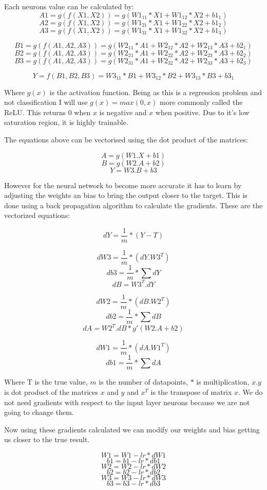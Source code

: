 \documentclass[11pt]{article}
\begin{document}
	Each neurons value can be calculated by:
	\[A1 = g(f(X1,X2)) = g(W1_{11}*X1 + W1_{12}*X2 + b1_{1})\]
	\[A2 = g(f(X1,X2)) = g(W1_{21}*X1 + W1_{22}*X2 + b1_{2})\]
	\[A3 = g(f(X1,X2)) = g(W1_{31}*X1 + W1_{32}*X2 + b1_{3})\]
	
	\[B1 = g(f(A1,A2,A3)) = g(W2_{11}*A1 + W2_{12}*A2 + W2_{13}*A3 + b2_{1})\]
	\[B2 = g(f(A1,A2,A3)) = g(W2_{21}*A1 + W2_{22}*A2 + W2_{23}*A3 + b2_{2})\]
	\[B3 = g(f(A1,A2,A3)) = g(W2_{31}*A1 + W2_{32}*A2 + W2_{33}*A3 + b2_{3})\]
	
	\[Y = f(B1,B2,B3) = W3_{11}*B1 + W3_{12}*B2 + W3_{13}*B3 + b3_{1}\]
	
	Where $g(x)$ is the activation function. Being as this is a regression problem and not classification I will use $g(x) = max(0,x)$ more commonly called the ReLU. This returns 0 when $x$ is negative and $x$ when positive. Due to it’s low saturation region, it is highly trainable. 
	
	The equations above can be vectorised using the dot product of the matrices:
	
	\[A = g(W1.X + b1)\]
	\[B = g(W2.A + b2)\]
	\[Y = W3.B + b3\]
	
	However for the neural network to become more accurate it has to learn by adjusting the weights an bias to bring the output closer to the target. This is done using a back propagation algorithm to calculate the gradients. These are the vectorized equations:
	
	\[dY = \frac{1}{m} * (Y-T) \]
	
	\[dW3 = \frac{1}{m} * (dY.W3^T) \]
	\[db3 = \frac{1}{m} * \sum dY \]
	\[dB = W3^T.dY\]
	
	\[dW2 = \frac{1}{m} * (dB.W2^T) \]
	\[db2 = \frac{1}{m} * \sum dB \]
	\[dA = W2^T.dB * g'(W2.A+b2)\]
	
	\[dW1 = \frac{1}{m} * (dA.W1^T) \]
	\[db1 = \frac{1}{m} * \sum dA \]
	
	Where T is the true value, $m$ is the number of datapoints, $*$ is multiplication, $x.y$ is dot product of the matrices $x$ and $y$ and $x^T$ is the transpose of matrix $x$. We do not need gradients with respect to the input layer neurons because we are not going to change them.

	Now using these gradients calculated we can modify our weights and bias getting us closer to the true result.
	
	\[W1 = W1 - lr * dW1\]
	\[b1 = b1 - lr * db1\]
	\[W2 = W2 - lr * dW2\]
	\[b2 = b2 - lr * db2\]
	\[W3 = W3 - lr * dW3\]
	\[b3 = b3 - lr * db3\]
	
\end{document}
